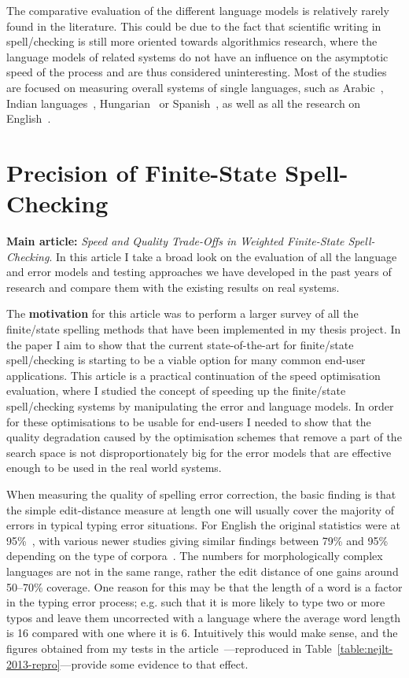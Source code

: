 \documentclass[officiallayout]{unihelcompling}
\begin{document}
The comparative evaluation of the different language models is relatively
rarely found in the literature. This could be due to the fact that scientific
writing in spell\-/checking is still more oriented towards algorithmics
research, where the language models of related systems do not have an influence
on the asymptotic speed of the process and are thus considered uninteresting.
Most of the studies are focused on measuring overall systems of single
languages, such as Arabic~\citep{attia2013improved}, Indian
languages~\citep{chaudhuri2002towards}, Hungarian~\citep{tron2005hunmorph} or
Spanish~\cite{otero2007contextual}, as well as all the research on
English~\citep{mitton1987spelling}.

\section{Precision of Finite-State Spell-Checking}
\label{sec:quality}

\textbf{Main article:} \emph{Speed and Quality Trade-Offs in Weighted
Finite-State Spell-Checking}. In this article I take a broad look on the
evaluation of all the language and error models and testing approaches we have
developed in the past years of research and compare them with the existing
results on real systems.

The \textbf{motivation} for this article was to perform a larger survey of all
the finite\-/state spelling methods that have been implemented in my thesis
project. In the paper I aim to show that the current state-of-the-art for
finite\-/state spell\-/checking is starting to be a viable option for many
common end-user applications. This article is a practical continuation of the
speed optimisation evaluation, where I studied the concept of speeding up the
finite\-/state spell\-/checking systems by manipulating the error and language
models. In order for these optimisations to be usable for end-users I needed to
show that the quality degradation caused by the optimisation schemes that
remove a part of the search space is not disproportionately big for the error
models that are effective enough to be used in the real world systems.

When measuring the quality of spelling error correction, the basic finding is
that the simple edit-distance measure at length one will usually cover the
majority of errors in typical typing error situations. For English the original
statistics were at 95\%~\citep{damerau1964technique}, with various newer
studies giving similar findings between 79\% and 95\% depending on the type
of corpora~\citep{kukich1992spelling}.  The numbers for morphologically complex
languages are not in the same range, rather the edit distance of one gains around
50--70\% coverage. One reason for this may be that the length of a word is a
factor in the typing error process; e.g. such that it is more likely to type
two or more typos and leave them uncorrected with a language where the average
word length is 16 compared with one where it is 6. Intuitively this would make
sense, and the figures obtained from my tests in the article~---reproduced in Table~\ref{table:nejlt-2013-repro}---provide some
evidence to that effect.
\end{document}

